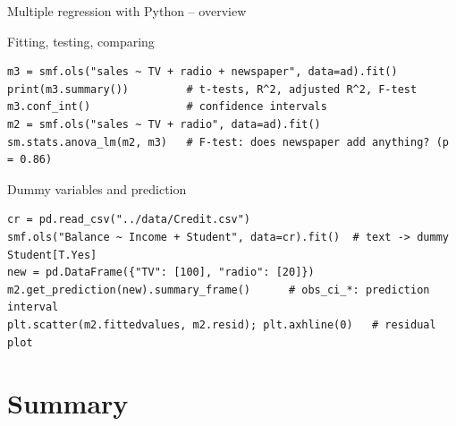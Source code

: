 \documentclass[aspectratio=169,11pt]{beamer}
\begin{document}
\begin{frame}[fragile]{Multiple regression with Python -- overview}
  \lstset{aboveskip=2pt,belowskip=2pt}
  \vspace{-8pt}
  \begin{block}{Fitting, testing, comparing}
\begin{lstlisting}
m3 = smf.ols("sales ~ TV + radio + newspaper", data=ad).fit()
print(m3.summary())         # t-tests, R^2, adjusted R^2, F-test
m3.conf_int()               # confidence intervals
m2 = smf.ols("sales ~ TV + radio", data=ad).fit()
sm.stats.anova_lm(m2, m3)   # F-test: does newspaper add anything? (p = 0.86)
\end{lstlisting}
  \end{block}
  \vspace{-4pt}
  \begin{block}{Dummy variables and prediction}
\begin{lstlisting}
cr = pd.read_csv("../data/Credit.csv")
smf.ols("Balance ~ Income + Student", data=cr).fit()  # text -> dummy Student[T.Yes]
new = pd.DataFrame({"TV": [100], "radio": [20]})
m2.get_prediction(new).summary_frame()      # obs_ci_*: prediction interval
plt.scatter(m2.fittedvalues, m2.resid); plt.axhline(0)   # residual plot
\end{lstlisting}
  \end{block}
\end{frame}

\section{Summary}
\end{document}
